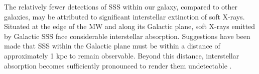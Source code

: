     
    
    
    The relatively fewer detections of SSS within our galaxy, compared to other galaxies, may be attributed to significant interstellar extinction of soft X-rays. Situated at the edge of the MW and along its Galactic plane, soft X-rays emitted by Galactic SSS face considerable interstellar absorption. Suggestions have been made that SSS within the Galactic plane must be within a distance of approximately 1 kpc to remain observable. Beyond this distance, interstellar absorption becomes sufficiently pronounced to render them undetectable \cite{van1992accreting}.
    
